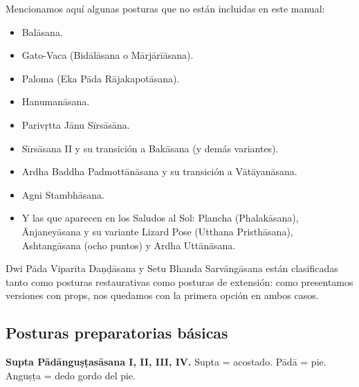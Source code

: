 Mencionamos aquí algunas posturas que no
están incluidas en este manual:
\begin{itemize}
\item Balāsana.
\item Gato-Vaca (Bidālāsana o Mārjārīāsana).
\item Paloma (Eka Pāda Rājakapotāsana).
\item Hanumanāsana.
\item Parivṛtta Jānu Sīrsāsāna.
\item Sīrsāsana II y su transición a Bakāsana
(y demás variantes).
\item Ardha Baddha Padmottānāsana y su
transición a Vātāyanāsana.
\item Agni Stambhāsana.
\item Y las que aparecen en los Saludos al
Sol: Plancha (Phalakāsana), Ānjaneyāsana y su
variante Lizard Pose (Utthana Pristhāsana),
Ashtangāsana (ocho puntos) y Ardha
Uttānāsana.
\end{itemize}

Dwi Pāda Viparīta Daṇḍāsana y Setu Bhanda
Sarvāngāsana están clasificadas tanto como
posturas restaurativas como posturas de
extensión: como presentamos versiones con
props, nos quedamos con la primera opción en
ambos casos.

\subsection{Posturas preparatorias básicas}
\label{section-posturas-preparatorias}

\medskip\noindent\textbf{Supta
Pādānguṣṭasāsana I, II, III, IV.}
Supta = acostado. Pādā = pie. Anguṣṭa = dedo
gordo del pie.

